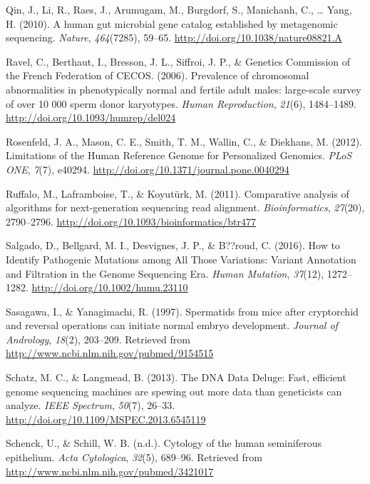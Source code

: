 \documentclass[12pt,twoside]{reedthesis}
\theoremstyle{definition}
\theoremstyle{definition}
\theoremstyle{remark}
\begin{document}
  \hypertarget{ref-Qin2010}{}
  Qin, J., Li, R., Raes, J., Arumugam, M., Burgdorf, S., Manichanh, C.,
  \ldots{} Yang, H. (2010). A human gut microbial gene catalog established
  by metagenomic sequencing. \emph{Nature}, \emph{464}(7285), 59--65.
  \url{http://doi.org/10.1038/nature08821.A}
  
  \hypertarget{ref-Ravel2006}{}
  Ravel, C., Berthaut, I., Bresson, J. L., Siffroi, J. P., \& Genetics
  Commission of the French Federation of CECOS. (2006). Prevalence of
  chromosomal abnormalities in phenotypically normal and fertile adult
  males: large-scale survey of over 10 000 sperm donor karyotypes.
  \emph{Human Reproduction}, \emph{21}(6), 1484--1489.
  \url{http://doi.org/10.1093/humrep/del024}
  
  \hypertarget{ref-Rosenfeld2012}{}
  Rosenfeld, J. A., Mason, C. E., Smith, T. M., Wallin, C., \& Diekhans,
  M. (2012). Limitations of the Human Reference Genome for Personalized
  Genomics. \emph{PLoS ONE}, \emph{7}(7), e40294.
  \url{http://doi.org/10.1371/journal.pone.0040294}
  
  \hypertarget{ref-Ruffalo2011}{}
  Ruffalo, M., Laframboise, T., \& Koyutürk, M. (2011). Comparative
  analysis of algorithms for next-generation sequencing read alignment.
  \emph{Bioinformatics}, \emph{27}(20), 2790--2796.
  \url{http://doi.org/10.1093/bioinformatics/btr477}
  
  \hypertarget{ref-Salgado2016}{}
  Salgado, D., Bellgard, M. I., Desvignes, J. P., \& B??roud, C. (2016).
  How to Identify Pathogenic Mutations among All Those Variations: Variant
  Annotation and Filtration in the Genome Sequencing Era. \emph{Human
  Mutation}, \emph{37}(12), 1272--1282.
  \url{http://doi.org/10.1002/humu.23110}
  
  \hypertarget{ref-Sasagawa}{}
  Sasagawa, I., \& Yanagimachi, R. (1997). Spermatids from mice after
  cryptorchid and reversal operations can initiate normal embryo
  development. \emph{Journal of Andrology}, \emph{18}(2), 203--209.
  Retrieved from \url{http://www.ncbi.nlm.nih.gov/pubmed/9154515}
  
  \hypertarget{ref-Schatz2013}{}
  Schatz, M. C., \& Langmead, B. (2013). The DNA Data Deluge: Fast,
  efficient genome sequencing machines are spewing out more data than
  geneticists can analyze. \emph{IEEE Spectrum}, \emph{50}(7), 26--33.
  \url{http://doi.org/10.1109/MSPEC.2013.6545119}
  
  \hypertarget{ref-Schenck}{}
  Schenck, U., \& Schill, W. B. (n.d.). Cytology of the human seminiferous
  epithelium. \emph{Acta Cytologica}, \emph{32}(5), 689--96. Retrieved
  from \url{http://www.ncbi.nlm.nih.gov/pubmed/3421017}
  
\end{document}

